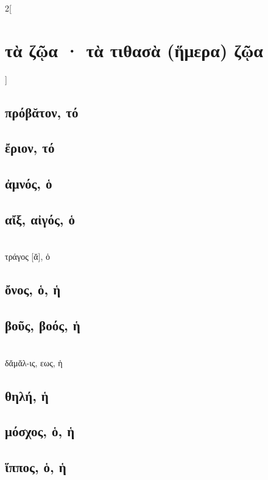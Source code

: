 \documentclass{book}
\begin{document}
\begin{multicols}{2}[\section{τὰ ζῷα · τὰ τιθασὰ (ἥμερα) ζῷα}]
\subsection{πρόβᾰτον, τό}
\subsection{ἔριον, τό}
\subsection{ἀμνός, ὁ}
\subsection{αἴξ, αἰγός, ὁ}
 ~\\
τράγος [ᾰ], ὁ
\subsection{ὄνος, ὁ, ἡ}
\subsection{βοῦς, βοός, ἡ}
 ~\\
δᾰμᾰλ-ις, εως, ἡ 
\subsection{θηλή, ἡ}
\subsection{μόσχος, ὁ, ἡ}
\subsection{ἵππος, ὁ, ἡ}
~
\end{multicols}
\newpage  
\end{document}
